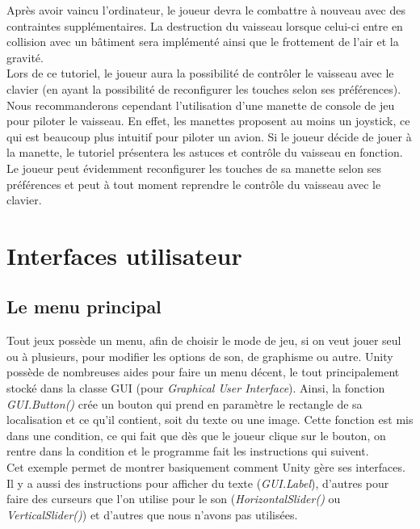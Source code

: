 \documentclass[12pt, titlepage]{article}
\begin{document}
\begin{spacing}{1.5}
Après avoir vaincu l'ordinateur, le joueur devra le combattre à nouveau avec des contraintes supplémentaires. La destruction du vaisseau lorsque celui-ci entre en collision avec un bâtiment sera implémenté ainsi que le frottement de l'air et la gravité. \\

Lors de ce tutoriel, le joueur aura la possibilité de contrôler le vaisseau avec le clavier (en ayant la possibilité de reconfigurer les touches selon ses préférences). Nous recommanderons cependant l'utilisation d'une manette de console de jeu pour piloter le vaisseau. En effet, les manettes proposent au moins un joystick, ce qui est beaucoup plus intuitif pour piloter un avion. Si le joueur décide de jouer à la manette, le tutoriel présentera les astuces et contrôle du vaisseau en fonction. Le joueur peut évidemment reconfigurer les touches de sa manette selon ses préférences et peut à tout moment reprendre le contrôle du vaisseau avec le clavier.\\

\newpage
\section{Interfaces utilisateur}

\subsection{Le menu principal}

Tout jeux possède un menu, afin de choisir le mode de jeu, si on veut jouer seul ou à plusieurs, pour modifier les options de son, de graphisme ou autre. Unity possède de nombreuses aides pour faire un menu décent, le tout principalement stocké dans la classe GUI (pour \textit{Graphical User Interface}). Ainsi, la fonction \textit{GUI.Button()} crée un bouton qui prend en paramètre le rectangle de sa localisation et ce qu'il contient, soit du texte ou une image. Cette fonction est mis dans une condition, ce qui fait que dès que le joueur clique sur le bouton, on rentre dans la condition et le programme fait les instructions qui suivent.\\

Cet exemple permet de montrer basiquement comment Unity gère ses interfaces. Il y a aussi des instructions pour afficher du texte (\textit{GUI.Label}), d'autres pour faire des curseurs que l'on utilise pour le son (\textit{HorizontalSlider()} ou \textit{VerticalSlider()}) et d'autres que nous n'avons pas utilisées.\\


\end{spacing}
\end{document}
